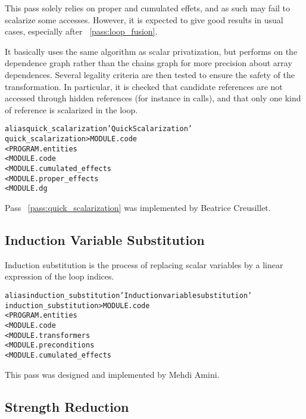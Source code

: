 \documentclass[a4paper]{report}
\newenvironment{PipsMake}{\begin{alltt}}{\end{alltt}}
\newcommand{\PipsPassRef}[1]{\texttt{\detokenize{#1}}~\ref{pass:#1}}
\newenvironment{PipsPass}[1]{\label{pass:#1}}{}
\begin{document}
\begin{PipsPass}{quick_scalarization}
  This pass solely relies on proper and cumulated effets, and as such
  may fail to scalarize some accesses. However, it is expected to give
  good results in usual cases, especially after
  \PipsPassRef{loop_fusion}.

  It basically uses the same algorithm as scalar privatization, but
  performs on the dependence graph rather than the chains graph for
  more precision about array dependences. Several legality criteria
  are then tested to ensure the safety of the transformation. In
  particular, it is checked that candidate references are not accessed
  through hidden references (for instance in calls), and that only one
  kind of reference is scalarized in the loop.
\end{PipsPass}


\begin{PipsMake}
alias quick_scalarization 'Quick Scalarization'
quick_scalarization  > MODULE.code
        < PROGRAM.entities
        < MODULE.code
        < MODULE.cumulated_effects
        < MODULE.proper_effects
        < MODULE.dg
\end{PipsMake}

Pass \PipsPassRef{quick_scalarization} was implemented by Beatrice Creusillet.

\subsection{Induction Variable Substitution}

\begin{PipsPass}{induction_substitution}
Induction substitution is the process of replacing scalar variables
by a linear expression of the loop indices.
\end{PipsPass}


\begin{PipsMake}
alias induction_substitution 'Induction variable substitution'
induction_substitution > MODULE.code
        < PROGRAM.entities
        < MODULE.code
        < MODULE.transformers
        < MODULE.preconditions
        < MODULE.cumulated_effects
\end{PipsMake}

This pass was designed and implemented by Mehdi Amini.

\subsection{Strength Reduction}
\end{document}
